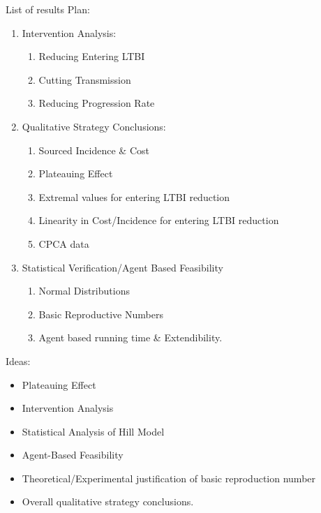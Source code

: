 \documentclass{amsart}
\begin{document}
\newpage
{\huge \color{red} List of results}
Plan:
\begin{enumerate}
  \item Intervention Analysis: 
    \begin{enumerate}
      \item Reducing Entering LTBI
      \item Cutting Transmission
      \item Reducing Progression Rate
    \end{enumerate}
  \item Qualitative Strategy Conclusions:
    \begin{enumerate}
      \item Sourced Incidence \& Cost
      \item Plateauing Effect
      \item Extremal values for entering LTBI reduction
      \item Linearity in Cost/Incidence for entering LTBI reduction
      \item CPCA data
    \end{enumerate}
  \item Statistical Verification/Agent Based Feasibility
    \begin{enumerate}
      \item Normal Distributions
      \item Basic Reproductive Numbers
      \item Agent based running time \& Extendibility. 
    \end{enumerate}
\end{enumerate}
Ideas:
\begin{itemize}
  \item Plateauing Effect
  \item Intervention Analysis
  \item Statistical Analysis of Hill Model
  \item Agent-Based Feasibility
  \item Theoretical/Experimental justification of basic reproduction number
  \item Overall qualitative strategy conclusions. 
\end{itemize}
\end{document}
